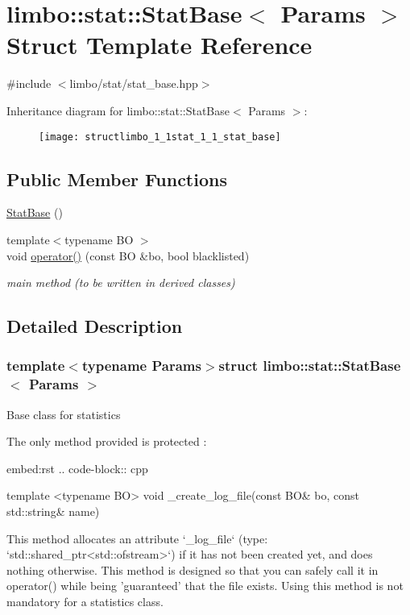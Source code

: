\hypertarget{structlimbo_1_1stat_1_1_stat_base}{}\section{limbo\+:\+:stat\+:\+:Stat\+Base$<$ Params $>$ Struct Template Reference}
\label{structlimbo_1_1stat_1_1_stat_base}


{\ttfamily \#include $<$limbo/stat/stat\+\_\+base.\+hpp$>$}

Inheritance diagram for limbo\+:\+:stat\+:\+:Stat\+Base$<$ Params $>$\+:\begin{figure}[H]
\begin{center}
\leavevmode
\texttt{[image: structlimbo\_1\_1stat\_1\_1\_stat\_base]}
\end{center}
\end{figure}
\subsection*{Public Member Functions}
\begin{DoxyCompactItemize}
\item 
\hyperlink{structlimbo_1_1stat_1_1_stat_base_aac1bea59acf624ed728660823189006f}{Stat\+Base} ()
\item 
{\footnotesize template$<$typename B\+O $>$ }\\void \hyperlink{structlimbo_1_1stat_1_1_stat_base_aaa6c2d6e3b520907955988daf73993ba}{operator()} (const B\+O \&bo, bool blacklisted)
\begin{DoxyCompactList}\small\item\em main method (to be written in derived classes) \end{DoxyCompactList}\end{DoxyCompactItemize}


\subsection{Detailed Description}
\subsubsection*{template$<$typename Params$>$struct limbo\+::stat\+::\+Stat\+Base$<$ Params $>$}

Base class for statistics

The only method provided is protected \+:

\begin{DoxyVerb}embed:rst
.. code-block:: cpp

  template <typename BO>
  void _create_log_file(const BO& bo, const std::string& name)


This method allocates an attribute `_log_file` (type: `std::shared_ptr<std::ofstream>`) if it has not been created yet, and does nothing otherwise. This method is designed so that you can safely call it in operator() while being 'guaranteed' that the file exists. Using this method is not mandatory for a statistics class.
\end{DoxyVerb}
 

